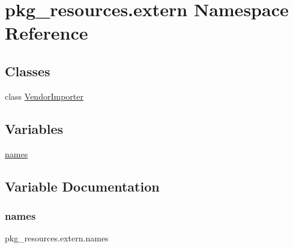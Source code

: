 \hypertarget{namespacepkg__resources_1_1extern}{}\section{pkg\+\_\+resources.\+extern Namespace Reference}
\label{namespacepkg__resources_1_1extern}
\subsection*{Classes}
\begin{DoxyCompactItemize}
\item 
class \hyperlink{classpkg__resources_1_1extern_1_1VendorImporter}{Vendor\+Importer}
\end{DoxyCompactItemize}
\subsection*{Variables}
\begin{DoxyCompactItemize}
\item 
\hyperlink{namespacepkg__resources_1_1extern_a4c3108bfff5b2cf0862c5614d703ba84}{names}
\end{DoxyCompactItemize}


\subsection{Variable Documentation}
\mbox{\label{namespacepkg__resources_1_1extern_a4c3108bfff5b2cf0862c5614d703ba84}} 
\subsubsection{\texorpdfstring{names}{names}}
{\footnotesize\ttfamily pkg\+\_\+resources.\+extern.\+names}


